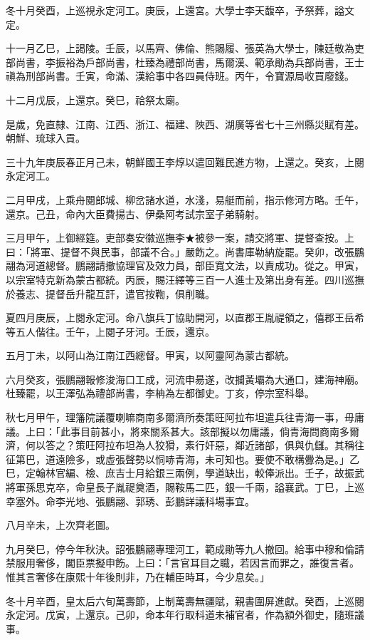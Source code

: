 \begin{pinyinscope}
冬十月癸酉，上巡視永定河工。庚辰，上還宮。大學士李天馥卒，予祭葬，謚文定。

十一月乙巳，上謁陵。壬辰，以馬齊、佛倫、熊賜履、張英為大學士，陳廷敬為吏部尚書，李振裕為戶部尚書，杜臻為禮部尚書，馬爾漢、範承勛為兵部尚書，王士禛為刑部尚書。壬寅，命滿、漢給事中各四員侍班。丙午，令寶源局收買廢錢。

十二月戊辰，上還京。癸巳，祫祭太廟。

是歲，免直隸、江南、江西、浙江、福建、陜西、湖廣等省七十三州縣災賦有差。朝鮮、琉球入貢。

三十九年庚辰春正月己未，朝鮮國王李焞以遣回難民進方物，上還之。癸亥，上閱永定河工。

二月甲戌，上乘舟閱郎城、柳岔諸水道，水淺，易艇而前，指示修河方略。壬午，還京。己丑，命內大臣費揚古、伊桑阿考試宗室子弟騎射。

三月甲午，上御經筵。吏部奏安徽巡撫李★被參一案，請交將軍、提督查按。上曰：「將軍、提督不與民事，部議不合。」嚴飭之。尚書庫勒納旋罷。癸卯，改張鵬翮為河道總督。鵬翮請撤協理官及效力員，部臣寬文法，以責成功。從之。甲寅，以宗室特克新為蒙古都統。丙辰，賜汪繹等三百一人進士及第出身有差。四川巡撫於養志、提督岳升龍互訐，遣官按鞫，俱削職。

夏四月庚辰，上閱永定河。命八旗兵丁協助開河，以直郡王胤禔領之，僖郡王岳希等五人偕往。壬午，上閱子牙河。壬辰，還京。

五月丁未，以阿山為江南江西總督。甲寅，以阿靈阿為蒙古都統。

六月癸亥，張鵬翮報修浚海口工成，河流申昜遂，改攔黃壩為大通口，建海神廟。杜臻罷，以王澤弘為禮部尚書，李柟為左都御史。丁亥，停宗室科舉。

秋七月甲午，理籓院議覆喇嘛商南多爾濟所奏策旺阿拉布坦遣兵往青海一事，毋庸議。上曰：「此事目前甚小，將來關系甚大。該部擬以勿庸議，倘青海問商南多爾濟，何以答之？策旺阿拉布坦為人狡猾，素行奸惡，鄰近諸部，俱與仇讎。其稱往征第巴，道遠險多，或虛張聲勢以恫哧青海，未可知也。要使不敢構釁為是。」乙巳，定翰林官編、檢、庶吉士月給銀三兩例，學道缺出，較俸派出。壬子，故振武將軍孫思克卒，命皇長子胤禔奠酒，賜鞍馬二匹，銀一千兩，謚襄武。丁巳，上巡幸塞外。命李光地、張鵬翮、郭琇、彭鵬詳議科場事宜。

八月辛未，上次齊老圖。

九月癸巳，停今年秋決。詔張鵬翮專理河工，範成勛等九人撤回。給事中穆和倫請禁服用奢侈，閣臣票擬申飭。上曰：「言官耳目之職，若因言而罪之，誰復言者。惟其言奢侈在康熙十年後則非，乃在輔臣時耳，今少息矣。」

冬十月辛酉，皇太后六旬萬壽節，上制萬壽無疆賦，親書圍屏進獻。癸酉，上巡閱永定河。戊寅，上還京。己卯，命本年行取科道未補官者，作為額外御史，隨班議事。


\end{pinyinscope}
